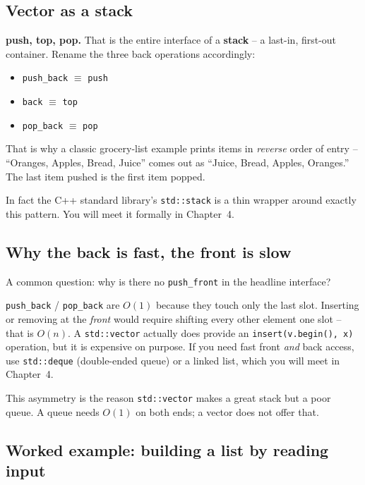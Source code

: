 \documentclass[11pt]{article}
\begin{document}
\subsection{Vector as a stack}

\begin{ideabox}
\textbf{push, top, pop.} That is the entire interface of a
\textbf{stack} -- a last-in, first-out container. Rename the three
back operations accordingly:
\begin{itemize}
    \item \texttt{push\_back} $\equiv$ \texttt{push}
    \item \texttt{back}      $\equiv$ \texttt{top}
    \item \texttt{pop\_back} $\equiv$ \texttt{pop}
\end{itemize}
That is why a classic grocery-list example prints items in
\emph{reverse} order of entry -- ``Oranges, Apples, Bread, Juice''
comes out as ``Juice, Bread, Apples, Oranges.'' The last item pushed
is the first item popped.
\end{ideabox}

In fact the C++ standard library's \texttt{std::stack} is a thin
wrapper around exactly this pattern. You will meet it formally in
Chapter~4.

\subsection{Why the back is fast, the front is slow}

A common question: why is there no \texttt{push\_front} in the
headline interface?

\begin{ideabox}
\texttt{push\_back} / \texttt{pop\_back} are $O(1)$ because they
touch only the last slot. Inserting or removing at the \emph{front}
would require shifting every other element one slot -- that is
$O(n)$. A \texttt{std::vector} actually does provide an
\texttt{insert(v.begin(), x)} operation, but it is expensive on
purpose. If you need fast front \emph{and} back access, use
\texttt{std::deque} (double-ended queue) or a linked list, which you
will meet in Chapter~4.
\end{ideabox}

This asymmetry is the reason \texttt{std::vector} makes a great stack
but a poor queue. A queue needs $O(1)$ on both ends; a vector does
not offer that.

\subsection{Worked example: building a list by reading input}
\end{document}
